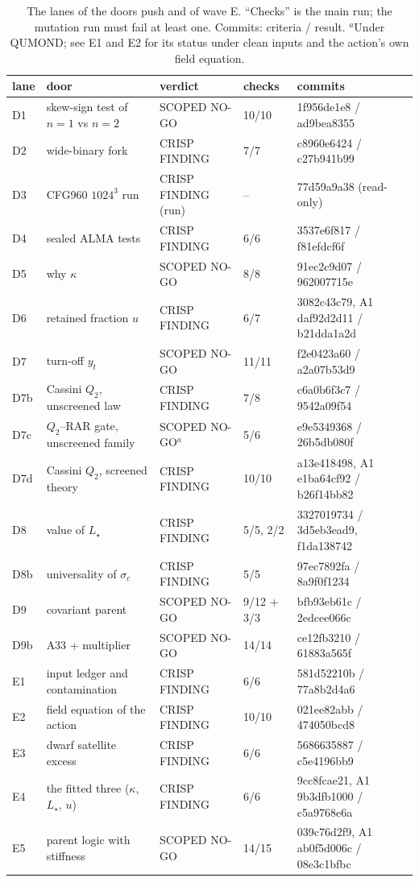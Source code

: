 \documentclass[10pt]{article}
\begin{document}
\begin{table}[t]\centering\small
\caption{The lanes of the doors push and of wave E. ``Checks'' is the main run; the mutation run must fail at least one. Commits: criteria / result. $^a$Under QUMOND; see E1 and E2 for its status under clean inputs and the action's own field equation.}\label{tab:lanes}
\begin{tabular}{llllp{}}
\toprule
lane & door & verdict & checks & commits\\
\midrule
D1 & skew-sign test of $n=1$ vs $n=2$ & SCOPED NO-GO & 10/10 & 1f956de1e8 / ad9bea8355\\
D2 & wide-binary fork & CRISP FINDING & 7/7 & c8960e6424 / c27b941b99\\
D3 & CFG960 $1024^3$ run & CRISP FINDING (run) & -- & 77d59a9a38 (read-only)\\
D4 & sealed ALMA tests & CRISP FINDING & 6/6 & 3537e6f817 / f81efdcf6f\\
D5 & why $\kappa$ & SCOPED NO-GO & 8/8 & 91ec2c9d07 / 962007715e\\
D6 & retained fraction $u$ & CRISP FINDING & 6/7 & 3082c43c79, A1 daf92d2d11 / b21dda1a2d\\
D7 & turn-off $y_t$ & SCOPED NO-GO & 11/11 & f2e0423a60 / a2a07b53d9\\
D7b & Cassini $Q_2$, unscreened law & CRISP FINDING & 7/8 & c6a0b6f3c7 / 9542a09f54\\
D7c & $Q_2$--RAR gate, unscreened family & SCOPED NO-GO$^a$ & 5/6 & e9e5349368 / 26b5db080f\\
D7d & Cassini $Q_2$, screened theory & CRISP FINDING & 10/10 & a13e418498, A1 e1ba64cf92 / b26f14bb82\\
D8 & value of $L_\star$ & CRISP FINDING & 5/5, 2/2 & 3327019734 / 3d5eb3ead9, f1da138742\\
D8b & universality of $\sigma_c$ & CRISP FINDING & 5/5 & 97ec7892fa / 8a9f0f1234\\
D9 & covariant parent & SCOPED NO-GO & 9/12 + 3/3 & bfb93eb61c / 2edcee066c\\
D9b & A33 + multiplier & SCOPED NO-GO & 14/14 & ce12fb3210 / 61883a565f\\
\midrule
E1 & input ledger and contamination & CRISP FINDING & 6/6 & 581d52210b / 77a8b2d4a6\\
E2 & field equation of the action & CRISP FINDING & 10/10 & 021ee82abb / 474050bcd8\\
E3 & dwarf satellite excess & CRISP FINDING & 6/6 & 5686635887 / c5e4196bb9\\
E4 & the fitted three ($\kappa$, $L_\star$, $u$) & CRISP FINDING & 6/6 & 9cc8fcae21, A1 9b3dfb1000 / c5a9768e6a\\
E5 & parent logic with stiffness & SCOPED NO-GO & 14/15 & 039c76d2f9, A1 ab0f5d006c / 08e3c1bfbc\\
\bottomrule
\end{tabular}
\end{table}
\end{document}
